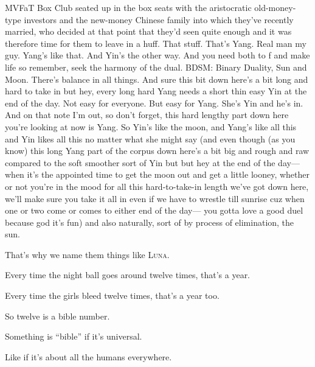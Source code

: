 {{{{				MVFaT Box Club seated up in the box seats with the aristocratic
				old-money-type investors and the new-money Chinese family into
				which they've recently married, who decided at that point that
				they'd seen quite enough and it was therefore time for them to
				leave in a huff.
				That stuff.
				That's Yang.
				Real man  my guy.
				Yang's like that.
				And Yin's the other way.
				And you need both to 
				f and make life
				so remember, seek the harmony of the dual.
				BDSM: Binary Duality, Sun and Moon. There's balance in all things.
				And sure this bit down here's a bit long and hard to take in but hey,
				every long hard Yang needs a short thin easy Yin at the end of the day.
				Not easy for everyone. But easy for Yang. She's Yin and he's in.
				And on that note I'm out, so don't forget, this hard lengthy part
				down here you're looking at now is Yang.
				So Yin's like the moon, and Yang's like all this
				and Yin likes all this no matter what she might say
				(and even though (as you know) this long Yang part of the
				corpus down here's a bit big and rough and raw compared to
				the soft smoother sort of Yin
				but but hey at the end of the day---%
				when it's the appointed time to get the moon out and get a little looney,
				whether or not you're in the mood for all this hard-to-take-in length
				we've got down here, we'll make sure you take it all in even if we have
				to wrestle till sunrise cuz when one or two come or comes to either end of the day---%
				you gotta love a good duel because god
				 it's fun)
				and also naturally, sort of by process of elimination, the sun.%
					{\!\!}
				}}

                That's why we name them things like \textsc{Luna}.

                Every time the night ball goes around twelve times, that's a year.

                Every time the girls bleed twelve times, that's a year too.

                So twelve is a bible number.

                Something is ``bible'' if it's universal.

                Like if it's about all the humans everywhere.

}}
